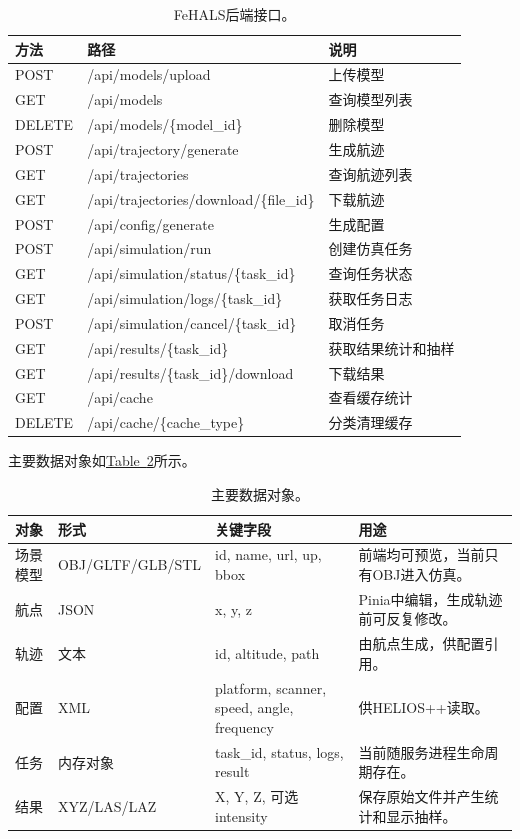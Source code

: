 \documentclass[a4paper,fleqn]{cas-sc}
\newcommand{\refTab}[1]{\hyperref[#1]{Table~\ref*{#1}}}
\begin{document}
\begin{table}[htbp]
  \centering
  \caption{FeHALS后端接口。}
  \begin{tabular}{p{2.5cm}p{5.5cm}p{5.5cm}}
    \toprule
    方法 & 路径 & 说明 \\
    \midrule
    POST & /api/models/upload & 上传模型 \\
    GET & /api/models & 查询模型列表 \\
    DELETE & /api/models/\{model\_id\} & 删除模型 \\
    POST & /api/trajectory/generate & 生成航迹 \\
    GET & /api/trajectories & 查询航迹列表 \\
    GET & /api/trajectories/download/\{file\_id\} & 下载航迹 \\
    POST & /api/config/generate & 生成配置 \\
    POST & /api/simulation/run & 创建仿真任务 \\
    GET & /api/simulation/status/\{task\_id\} & 查询任务状态 \\
    GET & /api/simulation/logs/\{task\_id\} & 获取任务日志 \\
    POST & /api/simulation/cancel/\{task\_id\} & 取消任务 \\
    GET & /api/results/\{task\_id\} & 获取结果统计和抽样 \\
    GET & /api/results/\{task\_id\}/download & 下载结果 \\
    GET & /api/cache & 查看缓存统计 \\
    DELETE & /api/cache/\{cache\_type\} & 分类清理缓存 \\
    \bottomrule
  \end{tabular}
  \label{tab:apis}
\end{table}

主要数据对象如\refTab{tab:dataobjects}所示。

\begin{table}[htbp]
  \centering
  \caption{主要数据对象。}
  \begin{tabular}{p{2.2cm}p{2.5cm}p{4cm}p{4cm}}
    \toprule
    对象 & 形式 & 关键字段 & 用途 \\
    \midrule
    场景模型 & OBJ/GLTF/GLB/STL & id, name, url, up, bbox & 前端均可预览，当前只有OBJ进入仿真。 \\
    航点 & JSON & x, y, z & Pinia中编辑，生成轨迹前可反复修改。 \\
    轨迹 & 文本 & id, altitude, path & 由航点生成，供配置引用。 \\
    配置 & XML & platform, scanner, speed, angle, frequency & 供HELIOS++读取。 \\
    任务 & 内存对象 & task\_id, status, logs, result & 当前随服务进程生命周期存在。 \\
    结果 & XYZ/LAS/LAZ & X, Y, Z, 可选intensity & 保存原始文件并产生统计和显示抽样。 \\
    \bottomrule
  \end{tabular}
  \label{tab:dataobjects}
\end{table}
\end{document}

